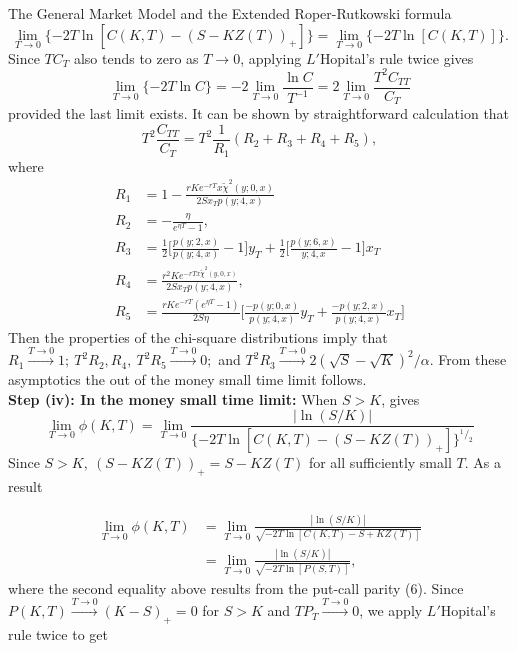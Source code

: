 \documentclass[unknownkeysallowed, compress]{beamer}
\newcommand*\rfrac[2]{{}^{#1}\!/_{#2}}
\theoremstyle{plain}
\begin{document}
\begin{frame}[allowframebreaks]{The General Market Model and the Extended Roper-Rutkowski formula}
\begin{equation}\label{34}
\lim_{T\rightarrow 0}\{-2T\ln[C(K,T) - (S-KZ(T))_+]\} = \lim_{T\rightarrow 0}\{-2T\ln[C(K,T)]\}.
\end{equation}
Since $TC_T$ also tends to zero as $T\rightarrow 0$, applying $L'$Hopital's rule twice gives
$$
\lim_{T\rightarrow 0}\{-2T\ln C\} = -2\lim_{T\rightarrow 0}\frac{\ln C}{T^{-1}} = 2\lim_{T\rightarrow 0}\frac{T^2C_{TT}}{C_T}
$$
provided the last limit exists. It can be shown by straightforward calculation that
$$
T^2\frac{C_{TT}}{C_T} = T^2\frac{1}{R_1}(R_2+R_3+R_4+R_5),
$$
where
\begin{align*}
R_1& = 1 - \frac{rKe^{-rT}x\tilde{\chi}^2(y;0,x)}{2Sx_Tp(y;4,x)}\\
R_2& = -\frac{\eta}{e^{\eta T} - 1},\\
R_3& = \frac{1}{2}\bigg[\frac{p(y;2,x)}{p(y;4,x)} - 1\bigg]y_T+\frac{1}{2}\bigg[\frac{p(y;6,x)}{y;4,x} - 1\bigg]x_T\\
R_4& = \frac{r^2 Ke^{-rTx\tilde{\chi}^2(y,0,x)}}{2Sx_Tp(y;4,x)},\\
R_5& = \frac{rKe^{-rT}(e^{\eta T} - 1)}{2S\eta}\bigg[\frac{-p(y;0,x)}{p(y;4,x)}y_T+\frac{-p(y;2,x)}{p(y;4,x)}x_T\bigg]
\end{align*}
Then the properties of the chi-square distributions imply that $R_1\stackrel{T\rightarrow 0}{\longrightarrow} 1; ~T^2R_2, R_4,~T^2R_5\stackrel{T\rightarrow 0}{\longrightarrow}0;$ and $T^2R_3\stackrel{T\rightarrow 0}{\longrightarrow}2(\sqrt{S} - \sqrt{K})^2/\alpha$. From these asymptotics the out of the money small time limit follows.\\

\textbf{Step (iv): In the money small time limit:} When $S>K$, %
gives
$$
\lim_{T\rightarrow 0}\phi(K,T) = \lim_{T\rightarrow 0}\frac{|\ln(S/K)|}{\{-2T\ln[C(K,T) - (S-KZ(T))_+]\}^{\rfrac{1}{2}}}
$$
Since $S>K,~ (S-KZ(T))_+ = S-KZ(T)$ for all sufficiently small $T$. As a result

\begin{equation}\label{35}
\begin{split}
\lim_{T\rightarrow 0}\phi(K,T)& = \lim_{T\rightarrow 0}\frac{|\ln(S/K)|}{\sqrt{-2T\ln[C(K,T) - S + KZ(T)]}}\\
& = \lim_{T\rightarrow 0}\frac{|\ln(S/K)|}{\sqrt{-2T\ln[P(S,T)]}},
\end{split}
\end{equation}
where the second equality above results from the put-call parity (6). Since $P(K,T)\stackrel{T\rightarrow 0}{\longrightarrow}(K-S)_+ = 0$ for $S>K$ and $TP_T\stackrel{T\rightarrow 0}{\longrightarrow}0$, we apply $L'$Hopital's rule twice to get


\end{frame}
\end{document}
